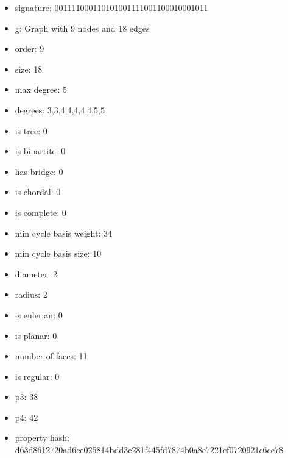 \newpage
\begin{figure}
\end{figure}
\begin{itemize}
\item signature: 001111000110101001111001100010001011
\item g: Graph with 9 nodes and 18 edges
\item order: 9
\item size: 18
\item max degree: 5
\item degrees: 3,3,4,4,4,4,4,5,5
\item is tree: 0
\item is bipartite: 0
\item has bridge: 0
\item is chordal: 0
\item is complete: 0
\item min cycle basis weight: 34
\item min cycle basis size: 10
\item diameter: 2
\item radius: 2
\item is eulerian: 0
\item is planar: 0
\item number of faces: 11
\item is regular: 0
\item p3: 38
\item p4: 42
\item property hash: d63d8612720ad6ce025814bdd3c281f445fd7874b0a8e7221ef0720921c6ce78
\end{itemize}
